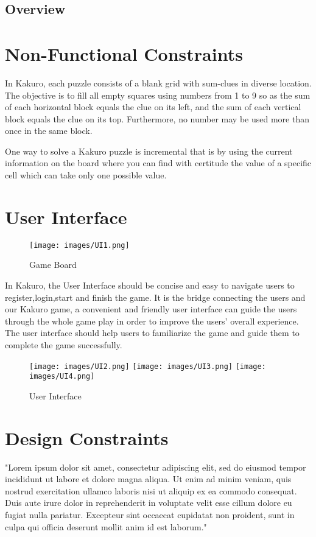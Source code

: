 \documentclass[12pt]{article}
\begin{document}
\newpage

\subsection{Overview}

\section{Non-Functional Constraints}

In Kakuro, each puzzle consists of a blank grid with sum-clues in diverse location. The objective is to fill all empty squares using numbers from 1 to 9 so as the sum of each horizontal block equals the clue on its left, and the sum of each vertical block equals the clue on its top. Furthermore, no number may be used more than once in the same block.

One way to solve a Kakuro puzzle is incremental that is by using the current information on the board where you can find with certitude the value of a specific cell which can take only one possible value.

\section{User Interface}
\begin{figure}[htbp]
    \centering
    \texttt{[image: images/UI1.png]}
    \caption{Game Board}
    \label{fig:Game Board}
\end{figure}

In Kakuro, the User Interface should be concise and easy to navigate users to register,login,start and finish the game. It is the bridge connecting the users and our Kakuro game, a convenient and friendly user interface can guide the users through the whole game play in order to improve the users' overall experience. The user interface should help users to familiarize the game and guide them to complete the game successfully.

\begin{figure}[htbp]
    \centering
    \texttt{[image: images/UI2.png]}
      \texttt{[image: images/UI3.png]}
          \texttt{[image: images/UI4.png]}
    \caption{User Interface}
    \label{fig:UI}
\end{figure}

\section{Design Constraints}
"Lorem ipsum dolor sit amet, consectetur adipiscing elit, sed do eiusmod tempor incididunt ut labore et dolore magna aliqua. Ut enim ad minim veniam, quis nostrud exercitation ullamco laboris nisi ut aliquip ex ea commodo consequat. Duis aute irure dolor in reprehenderit in voluptate velit esse cillum dolore eu fugiat nulla pariatur. Excepteur sint occaecat cupidatat non proident, sunt in culpa qui officia deserunt mollit anim id est laborum."
\end{document}
